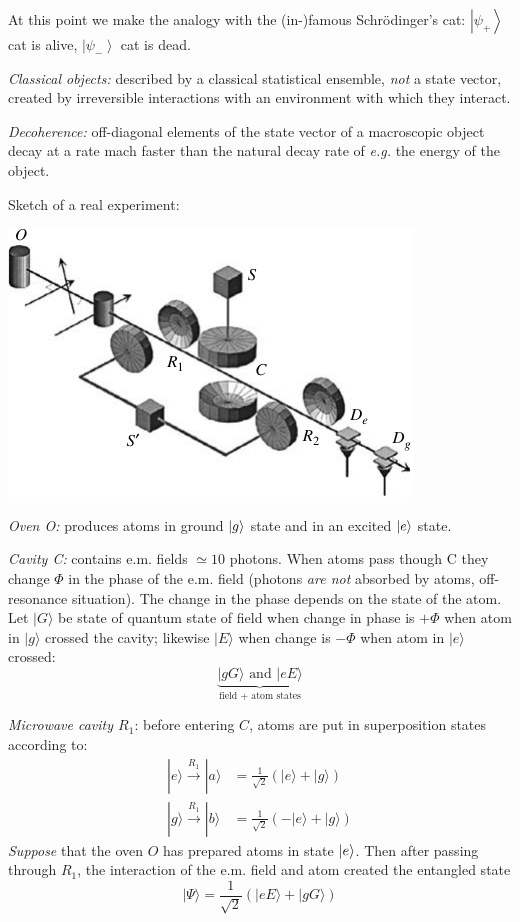 \documentclass[12pt]{article}
\newcommand{\be}{\begin{equation}}
\newcommand{\ee}{\end{equation}}
\begin{document}
At this point we make the analogy with the (in-)famous Schrödinger's cat:
\(\left|\psi_{+}\right\rangle\) cat is alive,
\(\left|\psi_{-}\right\rangle\) cat is dead.

\emph{Classical objects:} described by a classical
statistical ensemble, \emph{not} a
state vector, created by irreversible
interactions with an environment
with which they interact.

\emph{Decoherence:} off-diagonal
elements of the state
vector of a macroscopic
object decay at a rate
mach faster than the natural decay
rate of \textit{e.g.} the energy of the object.

Sketch of a real experiment:

\begin{center}
\includegraphics[width=\textwidth]{Figures/DecoherenceExperiment.pdf}
\end{center}

\emph{Oven O:} produces atoms
in ground $\ket{g}$ state
and in an excited $\ket{e}$
state.

\emph{Cavity C:} contains \mbox{e.m.} fields \(\simeq 10\) photons. When atoms
pass though C they change \(\Phi\) in the phase of
the \mbox{e.m.} field (photons \emph{are not} absorbed by atoms,
off-resonance situation). The change in the phase
depends on the state of the atom.
Let \(|G\rangle\) be state of quantum state of field when
change in phase is \(+\Phi\) when atom in \(|g\rangle\) crossed
the cavity; likewise \(|E\rangle\) when change is \(-\Phi\) when
atom in \(|e\rangle\) crossed:
\be
\underbrace{|g G\rangle \text { and }|e E\rangle}_{\text {field + atom states}}
\ee

\emph{Microwave cavity $R_1$}: before entering $C$, atoms are
put in superposition states
according to:
\be
\begin{aligned}
|e\rangle \stackrel{R_{1}}{\longrightarrow}|a\rangle&=\frac{1}{\sqrt{2}}(|e\rangle+|g\rangle) \\ 
|g\rangle \stackrel{R_{1}}{\longrightarrow}|b\rangle&=\frac{1}{\sqrt{2}}(-|e\rangle+|g\rangle)
\end{aligned}
\label{eq:g119}
\ee
\emph{Suppose} that the oven $O$ has prepared atoms in
state $\ket{e}$. Then after passing through \(R_{1}\), the
interaction of the \mbox{e.m.} field and atom created the
entangled state
\be
|\Psi\rangle=\frac{1}{\sqrt{2}}\left(|e E\rangle+|g G\rangle\right)
\ee
\end{document}

